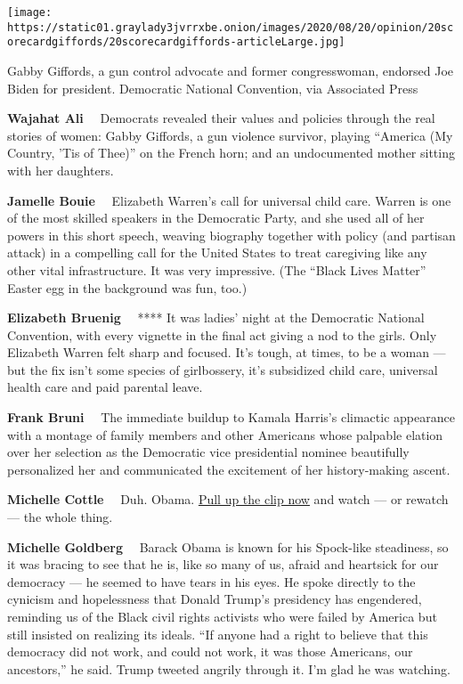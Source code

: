 \texttt{[image: https://static01.graylady3jvrrxbe.onion/images/2020/08/20/opinion/20scorecardgiffords/20scorecardgiffords-articleLarge.jpg]}

Gabby Giffords, a gun control advocate and former congresswoman,
endorsed Joe Biden for president. Democratic National Convention, via
Associated Press

\textbf{Wajahat Ali}~~ Democrats revealed their values and policies
through the real stories of women: Gabby Giffords, a gun violence
survivor, playing ``America (My Country, 'Tis of Thee)'' on the French
horn; and an undocumented mother sitting with her daughters.

\textbf{Jamelle Bouie}~~ Elizabeth Warren's call for universal child
care. Warren is one of the most skilled speakers in the Democratic
Party, and she used all of her powers in this short speech, weaving
biography together with policy (and partisan attack) in a compelling
call for the United States to treat caregiving like any other vital
infrastructure. It was very impressive. (The ``Black Lives Matter''
Easter egg in the background was fun, too.)

\textbf{Elizabeth Bruenig}~~ **** It was ladies' night at the Democratic
National Convention, with every vignette in the final act giving a nod
to the girls. Only Elizabeth Warren felt sharp and focused. It's tough,
at times, to be a woman --- but the fix isn't some species of
girlbossery, it's subsidized child care, universal health care and paid
parental leave.

\textbf{Frank Bruni}~~ The immediate buildup to Kamala Harris's
climactic appearance with a montage of family members and other
Americans whose palpable elation over her selection as the Democratic
vice presidential nominee beautifully personalized her and communicated
the excitement of her history-making ascent.

\textbf{Michelle Cottle}~~ Duh. Obama.
\href{https://www.youtube.com/watch?v=oaalF5y2P0k}{Pull up the clip now}
and watch --- or rewatch --- the whole thing.

\textbf{Michelle Goldberg}~~ Barack Obama is known for his Spock-like
steadiness, so it was bracing to see that he is, like so many of us,
afraid and heartsick for our democracy --- he seemed to have tears in
his eyes. He spoke directly to the cynicism and hopelessness that Donald
Trump's presidency has engendered, reminding us of the Black civil
rights activists who were failed by America but still insisted on
realizing its ideals. ``If anyone had a right to believe that this
democracy did not work, and could not work, it was those Americans, our
ancestors,'' he said. Trump tweeted angrily through it. I'm glad he was
watching.

